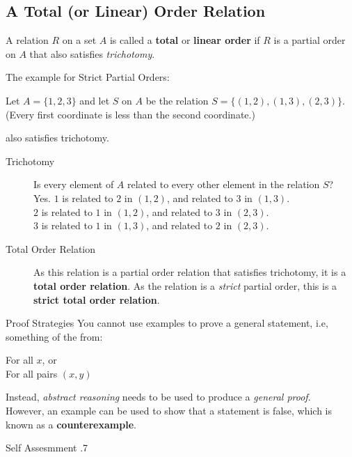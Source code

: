 \documentclass[../notes.tex]{subfiles}
\begin{document}
			\subsection{A Total (or Linear) Order Relation}
				A relation $R$ on a set $A$ is called a \textbf{total} or \textbf{linear order} if $R$ is a partial order on $A$ that also satisfies \textit{trichotomy}.
				\begin{example}
					The example for Strict Partial Orders:
					\begin{indentparagraph}
						Let $A = \{1, 2, 3\}$ and let $S$ on $A$ be the relation $S = \bigl\{(1, 2), (1, 3), (2, 3)\bigr\}$. (Every first coordinate is less than the second coordinate.)
					\end{indentparagraph}
					also satisfies trichotomy.
					\begin{description}
						\item[Trichotomy] Is every element of $A$ related to every other element in the relation $S$?\\
							Yes. $1$ is related to $2$ in $(1, 2)$, and related to $3$ in $(1, 3)$.\\
							$2$ is related to $1$ in $(1, 2)$, and related to $3$ in $(2, 3)$.\\
							$3$ is related to $1$ in $(1, 3)$, and related to $2$ in $(2, 3)$.
						\item[Total Order Relation] As this relation is a partial order relation that satisfies trichotomy, it is a \textbf{total order relation}. As the relation is a \textit{strict} partial order, this is a \textbf{strict total order relation}.
					\end{description}
				\end{example}
				\begin{sidenote}{Proof Strategies}
					You cannot use examples to prove a general statement, i.e, something of the from:
						\begin{indentparagraph}
							For all $x$, or\\
							For all pairs $(x, y)$
						\end{indentparagraph}
					Instead, \textit{abstract reasoning} needs to be used to produce a \textit{general proof}.\\
					However, an example can be used to show that a statement is false, which is known as a \textbf{counterexample}.
				\end{sidenote}
				\begin{exercise}{Self Assesmment \thechapter.7}
				\end{exercise}
		\pagebreak
\end{document}
